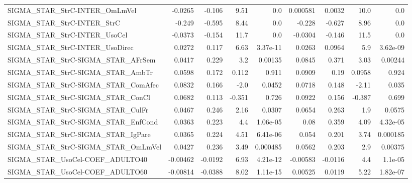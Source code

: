 \begin{tabular}{lrrrrrrrr}
SIGMA\_STAR\_StrC-INTER\_OmLmVel          &     -0.0265 &       -0.106 &     9.51 &      0.0 &   0.000581 &      0.0032 &         10.0 &           0.0 \\
SIGMA\_STAR\_StrC-INTER\_StrC             &      -0.249 &       -0.595 &     8.44 &      0.0 &     -0.228 &      -0.627 &         8.96 &           0.0 \\
SIGMA\_STAR\_StrC-INTER\_UsoCel           &     -0.0373 &       -0.154 &     11.7 &      0.0 &    -0.0304 &      -0.146 &         11.5 &           0.0 \\
SIGMA\_STAR\_StrC-INTER\_UsoDirec         &      0.0272 &        0.117 &     6.63 & 3.37e-11 &     0.0263 &      0.0964 &          5.9 &      3.62e-09 \\
SIGMA\_STAR\_StrC-SIGMA\_STAR\_AFrSem      &      0.0417 &        0.229 &      3.2 &  0.00135 &     0.0845 &       0.371 &         3.03 &       0.00244 \\
SIGMA\_STAR\_StrC-SIGMA\_STAR\_AmbTr       &      0.0598 &        0.172 &    0.112 &    0.911 &     0.0909 &        0.19 &       0.0958 &         0.924 \\
SIGMA\_STAR\_StrC-SIGMA\_STAR\_ComAfec     &      0.0832 &        0.166 &     -2.0 &   0.0452 &     0.0718 &       0.148 &        -2.11 &         0.035 \\
SIGMA\_STAR\_StrC-SIGMA\_STAR\_ConCl       &      0.0682 &        0.113 &   -0.351 &    0.726 &     0.0922 &       0.156 &       -0.387 &         0.699 \\
SIGMA\_STAR\_StrC-SIGMA\_STAR\_CulFr       &      0.0467 &        0.246 &     2.16 &   0.0307 &     0.0654 &       0.263 &          1.9 &        0.0575 \\
SIGMA\_STAR\_StrC-SIGMA\_STAR\_EnfCond     &      0.0363 &        0.223 &      4.4 & 1.06e-05 &       0.08 &       0.359 &         4.09 &      4.32e-05 \\
SIGMA\_STAR\_StrC-SIGMA\_STAR\_IgPare      &      0.0365 &        0.224 &     4.51 & 6.41e-06 &      0.054 &       0.201 &         3.74 &      0.000185 \\
SIGMA\_STAR\_StrC-SIGMA\_STAR\_OmLmVel     &      0.0427 &        0.236 &     3.49 & 0.000485 &     0.0562 &       0.203 &          2.9 &       0.00375 \\
SIGMA\_STAR\_UsoCel-COEF\_ADULTO40        &    -0.00462 &      -0.0192 &     6.93 & 4.21e-12 &   -0.00583 &     -0.0116 &          4.4 &       1.1e-05 \\
SIGMA\_STAR\_UsoCel-COEF\_ADULTO60        &    -0.00814 &      -0.0388 &     8.02 & 1.11e-15 &    0.00525 &      0.0119 &         5.22 &      1.82e-07 \\

\end{tabular}
